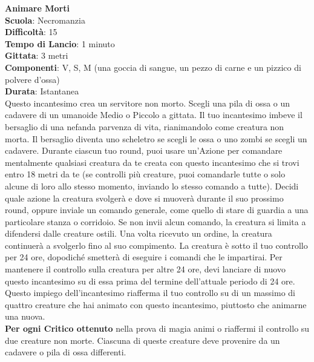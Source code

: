 \begin{multicols}{2}
\medskip\textbf{Animare Morti}\\
\textbf{Scuola}: Necromanzia\\
\textbf{Difficoltà}:  15\\
\textbf{Tempo di Lancio}: 1 minuto\\
\textbf{Gittata}: 3 metri\\
\textbf{Componenti}: V, S, M (una goccia di sangue, un pezzo di carne e un pizzico di polvere d’ossa)\\
\textbf{Durata}: Istantanea\\
Questo incantesimo crea un servitore non morto. Scegli una pila di ossa o un cadavere di un umanoide Medio o Piccolo a gittata. Il tuo incantesimo imbeve il bersaglio di una nefanda parvenza di vita, rianimandolo come creatura non morta. Il bersaglio diventa uno scheletro se scegli le ossa o uno zombi se scegli un cadavere. Durante ciascun tuo round, puoi usare un'Azione per comandare mentalmente qualsiasi creatura da te creata con questo incantesimo che si trovi entro 18 metri da te (se controlli più creature, puoi comandarle tutte o solo alcune di loro allo stesso momento, inviando lo stesso comando a tutte). Decidi quale azione la creatura svolgerà e dove si muoverà durante il suo prossimo round, oppure inviale un comando generale, come quello di stare di guardia a una particolare stanza o corridoio. Se non invii alcun comando, la creatura si limita a difendersi dalle creature ostili. Una volta ricevuto un ordine, la creatura continuerà a svolgerlo fino al suo compimento. La creatura è sotto il tuo controllo per 24 ore, dopodiché smetterà di eseguire i comandi che le impartirai. Per mantenere il controllo sulla creatura per altre 24 ore, devi lanciare di nuovo questo incantesimo su di essa prima del termine dell'attuale periodo di 24 ore. Questo impiego dell'incantesimo riafferma il tuo controllo su di  un massimo di quattro creature che hai animato con questo incantesimo, piuttosto che animarne una nuova.\\
\textbf{Per ogni Critico ottenuto} nella prova di magia animi o riaffermi il controllo su due creature non morte. Ciascuna di queste creature deve provenire da un cadavere o pila di ossa differenti.


\end{multicols}
